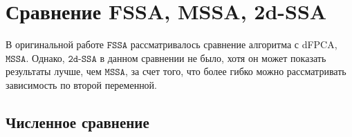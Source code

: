 \documentclass[12pt, specialist, subf
]{disser}
\theoremstyle{definition}
\newcommand{\SSA}{\texttt{SSA}}
\newcommand{\MSSA}{\texttt{MSSA}}
\newcommand{\FSSA}{\texttt{FSSA}}
\newcommand{\DSSA}{\texttt{2d-SSA}}
\newcommand{\TS}{\mathsf{X}}
\begin{document}















\section{Сравнение FSSA, MSSA, 2d-SSA}

\label{sec:compare_fssa_ssa}

В оригинальной работе $\FSSA$ \cite{haghbin2019functionalsingularspectrumanalysis} рассматривалось сравнение алгоритма с dFPCA, $\MSSA$. Однако, $\DSSA$ в данном сравнении не было, хотя он может показать результаты лучше, чем $\MSSA$, за счет того, что более гибко можно рассматривать зависимость по второй переменной.


\subsection{Численное сравнение}
\end{document}
